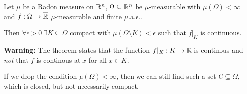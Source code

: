 \begin{thm}
  Let $\mu$ be a Radon measure on $\mathbb{R}^{n}$, $\Omega \subseteq \mathbb{R}^{n}$ be $\mu$-measurable 
  with $\mu(\Omega) < \infty$ and $f: \Omega \to \overline{\mathbb{R}}$ $\mu$-measurable and finite $\mu$.a.e..

  Then $\forall  \epsilon > 0\ \exists K \subseteq \Omega$ compact with $\mu(\Omega \setminus K) < \epsilon$ such that $f|_K$ is continuous.


\end{thm}
\begin{rem}[]
  \textbf{Warning:} The theorem states that the function $f|_K: K \to \overline{\mathbb{R}}$ is continous and \emph{not} that $f$ is continous at $x$ for all $x \in K$.

  If we drop the condition $\mu(\Omega) < \infty$, then we can still find such a set $C \subseteq \Omega$, which is closed, but not necessarily compact.
\end{rem}
